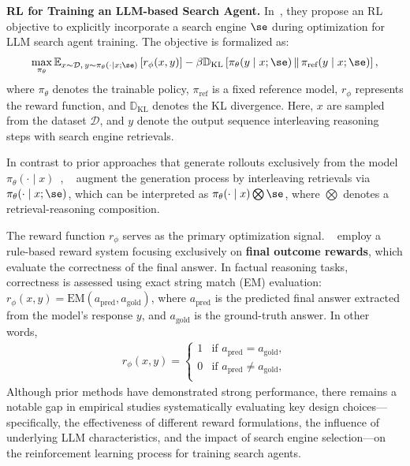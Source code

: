 \textbf{RL for Training an LLM-based Search Agent.}
In~\citep{jin2025search,zheng2025deepresearcher}, they propose an RL objective to explicitly incorporate a search engine $\se$ during optimization for LLM search agent training. The objective is formalized as:
\begin{gather}\label{eq:rl-retriever}
    \max_{\pi_\theta} \mathbb{E}_{x \sim \mathcal{D},\, y \sim \pi_{\theta}(\cdot \mid x; \se)}
    \left[ r_{\phi}(x, y) \right] 
    - \beta \mathbb{D}_{\text{KL}}\left[ \pi_{\theta}(y \mid x; \se) \,\|\, \pi_{\text{ref}}(y \mid x; \se) \right],
\end{gather}
where $\pi_{\theta}$ denotes the trainable policy, $\pi_{\text{ref}}$ is a fixed reference model, $r_{\phi}$ represents the reward function, and $\mathbb{D}_{\text{KL}}$ denotes the KL divergence. Here, $x$ are sampled from the dataset $\mathcal{D}$, and $y$ denote the output sequence interleaving reasoning steps with search engine retrievals. 

In contrast to prior approaches that generate rollouts exclusively from the model $\pi_{\theta}(\cdot \mid x)$~\citep{ouyang2022training,rafailov2023direct}, ~\citep{jin2025search,zheng2025deepresearcher} augment the generation process by interleaving retrievals via $\pi_{\theta}(\cdot \mid x; \se)$, which can be interpreted as $\pi_{\theta}(\cdot \mid x) \bigotimes \se$, where $\bigotimes$ denotes a retrieval-reasoning composition.

The reward function $r_{\phi}$ serves as the primary optimization signal. ~\citep{jin2025search,zheng2025deepresearcher} employ a rule-based reward system focusing exclusively on \textbf{final outcome rewards}, which evaluate the correctness of the final answer. 
In factual reasoning tasks, correctness is assessed using exact string match (EM) evaluation: $r_{\phi}(x, y) = \text{EM}(a_\text{pred}, a_\text{gold})$,
where $a_\text{pred}$ is the predicted final answer extracted from the model's response $y$, and $a_\text{gold}$ is the ground-truth answer.
In other words,
\begin{gather}
r_{\phi}(x, y) = 
\begin{cases}
    1              & \text{if } a_{\text{pred}} = a_{\text{gold}}, \\
    0              & \text{if } a_{\text{pred}} \neq a_{\text{gold}}, \\
\end{cases}
\end{gather}
Although prior methods have demonstrated strong performance, there remains a notable gap in empirical studies systematically evaluating key design choices---specifically, the effectiveness of different reward formulations, the influence of underlying LLM characteristics, and the impact of search engine selection---on the reinforcement learning process for training search agents.

